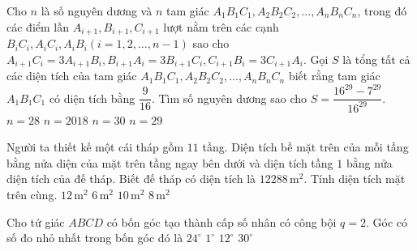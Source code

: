 \begin{ex}%
	Cho $n$ là số nguyên dương và $n$ tam giác $A_1B_1C_1,A_2B_2C_2,\ldots,A_nB_nC_n$, trong đó các điểm lần ${A}_{i+1},{B}_{i+1},{C}_{i+1}$ lượt nằm trên các cạnh $B_iC_i,A_iC_i,A_iB_i(i=1,2,\ldots,n-1)$ sao cho ${A}_{i+1}C_i=3{A}_{i+1}B_i,{B}_{i+1}A_i=3{B}_{i+1}C_i,{C}_{i+1}B_i=3{C}_{i+1}A_i$. Gọi $S$ là tổng tất cả các diện tích của tam giác $A_1B_1C_1,A_2B_2C_2,\ldots,A_nB_nC_n$ biết rằng tam giác $A_1B_1C_1$ có diện tích bằng $\dfrac{9}{16}$. Tìm số nguyên dương sao cho $S=\dfrac{{16}^{29}-7^{29}}{{16}^{29}}$.
	\choice
	{$n=28$}
	{$n=2018$}
	{$n=30$}
	{\True $n=29$}
\end{ex}
\begin{ex}%
	Người ta thiết kế một cái tháp gồm $11$ tầng. Diện tích bề mặt trên của mỗi tầng bằng nửa diện của mặt trên tầng ngay bên dưới và diện tích tầng $1$ bằng nửa diện tích của đế tháp. Biết đế tháp có diện tích là $12288\, \mathrm{m}^2$. Tính diện tích mặt trên cùng.
	\choice
	{$12\, \mathrm{m}^2$}
	{\True $6\, \mathrm{m}^2$}
	{$10\, \mathrm{m}^2$}
	{$8\, \mathrm{m}^2$}
\end{ex}

\begin{ex}%
	Cho tứ giác $ABCD$ có bốn góc tạo thành cấp số nhân có công bội $ q=2 $. Góc có số đo nhỏ nhất trong bốn góc đó là
	\choice
	{\True $ 24^\circ $}
	{$ 1^\circ $}
	{$ 12^\circ $}
	{$ 30^\circ $}
\end{ex}

